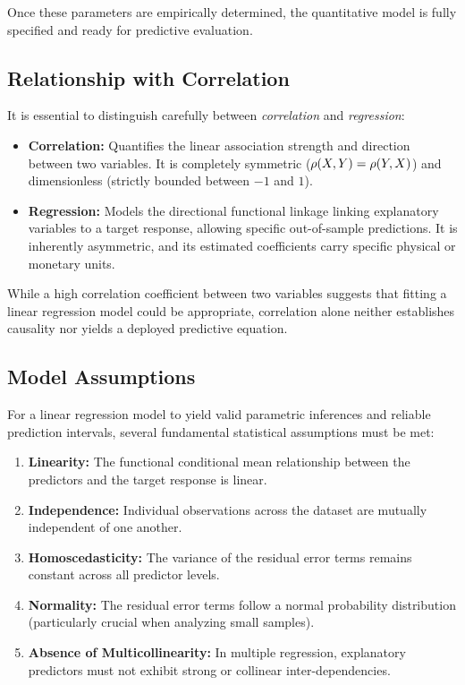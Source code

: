 Once these parameters are empirically determined, the quantitative model is fully specified and ready for predictive evaluation.

\subsection{Relationship with Correlation}

It is essential to distinguish carefully between \emph{correlation} and \emph{regression}:

\begin{itemize}
	\item \textbf{Correlation:} Quantifies the linear association strength and direction between two variables. It is completely symmetric ($\rho(X,Y) = \rho(Y,X)$) and dimensionless (strictly bounded between $-1$ and $1$).
	\item \textbf{Regression:} Models the directional functional linkage linking explanatory variables to a target response, allowing specific out-of-sample predictions. It is inherently asymmetric, and its estimated coefficients carry specific physical or monetary units.
\end{itemize}

While a high correlation coefficient between two variables suggests that fitting a linear regression model could be appropriate, correlation alone neither establishes causality nor yields a deployed predictive equation.

\subsection{Model Assumptions}

For a linear regression model to yield valid parametric inferences and reliable prediction intervals, several fundamental statistical assumptions must be met:

\begin{enumerate}
	\item \textbf{Linearity:} The functional conditional mean relationship between the predictors and the target response is linear.
	\item \textbf{Independence:} Individual observations across the dataset are mutually independent of one another.
	\item \textbf{Homoscedasticity:} The variance of the residual error terms remains constant across all predictor levels.
	\item \textbf{Normality:} The residual error terms follow a normal probability distribution (particularly crucial when analyzing small samples).
	\item \textbf{Absence of Multicollinearity:} In multiple regression, explanatory predictors must not exhibit strong or collinear inter-dependencies.
\end{enumerate}

